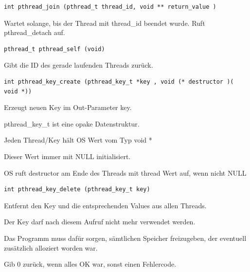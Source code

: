 \begin{multicols*}{5}
	\vspace{-5pt}

	\begin{lstlisting}
int pthread_join (pthread_t thread_id, void ** return_value )
	\end{lstlisting}
	\vspace{-5pt}
	Wartet solange, bis der Thread mit thread\_id beendet wurde. Ruft pthread\_detach auf.
	
	\vspace{-5pt}

	\begin{lstlisting}
pthread_t pthread_self (void)
	\end{lstlisting}
	\vspace{-5pt}
	Gibt die ID des gerade laufenden Threads zurück.

	\vspace{-5pt}

	\begin{lstlisting}
int pthread_key_create (pthread_key_t *key , void (* destructor )( void *))	
	\end{lstlisting}
	\vspace{-5pt}
		\begin{compactitem}[$\bullet$]
			\item Erzeugt neuen Key im Out-Parameter key. 
			\item pthread\_key\_t ist eine opake Datenstruktur. 
			\item Jeden Thread/Key hält OS Wert vom Typ void * 
			\item Dieser Wert immer mit NULL initialisiert. 
			\item OS ruft destructor am Ende des Threads mit thread Wert auf, wenn nicht NULL 
		\end{compactitem}
	
	
		\vspace{-5pt}
	
		
	\begin{lstlisting}
int pthread_key_delete (pthread_key_t key)
	\end{lstlisting}
	\vspace{-5pt} 
	\begin{compactitem} [$\bullet$]
		\item Entfernt den Key und die entsprechenden Values aus allen Threads. 
		\item Der Key darf nach diesem Aufruf nicht mehr verwendet werden. 
		\item Das Programm muss dafür sorgen, sämtlichen Speicher freizugeben, der eventuell zusätzlich alloziert worden war. 
		\item Gib 0 zurück, wenn alles OK war, sonst einen Fehlercode.
	\end{compactitem}


\end{multicols*}
